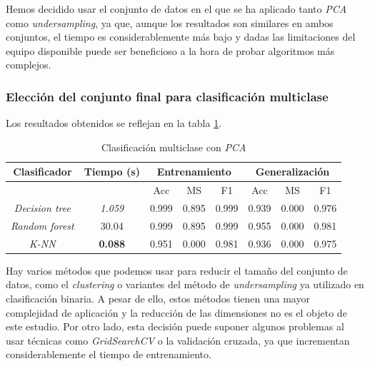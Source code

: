 Hemos decidido usar el conjunto de datos en el que se ha aplicado tanto \textit{PCA} como \textit{undersampling}, ya que, aunque los resultados son similares en ambos conjuntos, el tiempo es considerablemente más bajo y dadas las limitaciones del equipo disponible puede ser beneficioso a la hora de probar algoritmos más complejos.

\subsubsection{Elección del conjunto final para clasificación multiclase}
\label{subsubsec:eleccion_dataset_multi}

Los resultados obtenidos se reflejan en la tabla \ref{tabla:multi_pca}.

\begin{table}[th]
	\centering
	\begin{tabular}{ |c|c|c|c|c|c|c|c| }
		\hline
		\rowcolor{LightCyan}
		Clasificador & Tiempo (s) & \multicolumn{3}{c|}{Entrenamiento} & \multicolumn{3}{c|}{Generalización} \\
		\hline
		\rowcolor{LightCyan}
		& & Acc & MS & F1 & Acc & MS & F1 \\
		\hline
		\textit{Decision tree}  & \textit{1.059} & 0.999 & 0.895 & 0.999 & 0.939 & 0.000 & 0.976 \\
		\textit{Random forest}  & 30.04 & 0.999 & 0.895 & 0.999 & 0.955 & 0.000 & 0.981 \\
		\textit{K-NN}           & \textbf{0.088} & 0.951 & 0.000 & 0.981 & 0.936 & 0.000 & 0.975 \\
		\hline
	\end{tabular}
	\caption{Clasificación multiclase con \textit{PCA}}
	\label{tabla:multi_pca}
\end{table}

\vspace{1em}

Hay varios métodos que podemos usar para reducir el tamaño del conjunto de datos, como el \textit{clustering} o variantes del método de \textit{undersampling} ya utilizado en clasificación binaria. A pesar de ello, estos métodos tienen una mayor complejidad de aplicación y la reducción de las dimensiones no es el objeto de este estudio. Por otro lado, esta decisión puede suponer algunos problemas al usar técnicas como \textit{GridSearchCV} o la validación cruzada, ya que incrementan considerablemente el tiempo de entrenamiento.

\vspace{1em}

